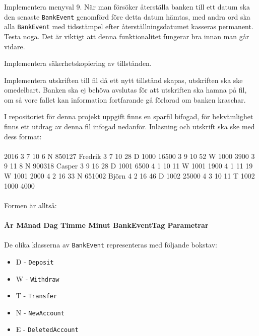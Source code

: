 \Task Implementera menyval 9. När man försöker återställa banken till ett datum ska den senaste \texttt{BankEvent} genomförd före detta datum hämtas, med andra ord ska alla \texttt{BankEvent} med tidsstämpel efter återställningsdatumet kasseras permanent. Testa noga. Det är viktigt att denna funktionalitet fungerar bra innan man går vidare.

\Task Implementera säkerhetskopiering av tillstånden.

\Subtask Implementera utskriften till fil då ett nytt tillstånd skapas, utskriften ska ske omedelbart. Banken ska ej behöva avslutas för att utskriften ska hamna på fil, om så vore fallet kan information fortfarande gå förlorad om banken kraschar.

I repositoriet för denna projekt uppgift finns en sparfil bifogad, för bekvämlighet finns ett utdrag av denna fil  infogad nedanför. Inläsning och utskrift ska ske med dess format:\\~\\
2016 3 7 10 6 N 850127 Fredrik 3 7 10 28 D 1000 16500 3 9 10 52 W 1000 3900 3 9 11 8 N 900318 Casper 3 9 16 28 D 1001 6500 4 1 10 11 W 1001 1900 4 1 11 19 W 1001 2000 4 2 16 33 N 651002 Björn 4 2 16 46 D 1002 25000 4 3 10 11 T 1002 1000 4000\\~\\
Formen är alltså:\\~\\
\textbf{År  Månad  Dag  Timme  Minut  BankEventTag  Parametrar}
\\~\\
De olika klasserna av \texttt{BankEvent} representeras med följande bokstav:

\begin{itemize}
\item D - \texttt{Deposit}
\item W - \texttt{Withdraw}
\item T - \texttt{Transfer}
\item N - \texttt{NewAccount}
\item E - \texttt{DeletedAccount}
\end{itemize}

